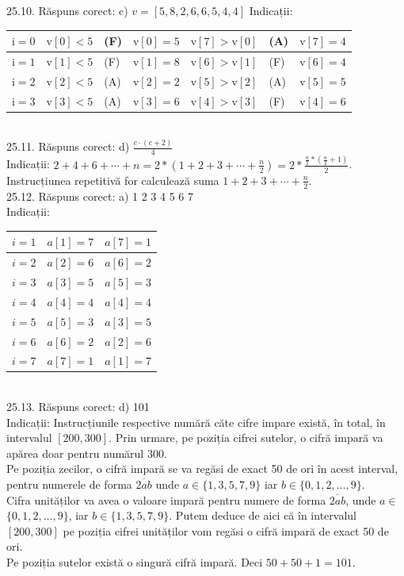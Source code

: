 25.10. Răspuns corect: c) $v=[5,8,2,6,6,5,4,4]$
Indicații:\\ \begin{tabular}{|l|ll|l|ll|l|} \hline $\mathrm{i}=0$ & $\mathrm{v}[0]<5$ & (F) & $\mathrm{v}[0]=5$ & $\mathrm{v}[7]>\mathrm{v}[0]$ & (A) & $\mathrm{v}[7]=4$ \\ \hline $\mathrm{i}=1$ & $\mathrm{v}[1]<5$ & (F) & $\mathrm{v}[1]=8$ & $\mathrm{v}[6]>\mathrm{v}[1]$ & (F) & $\mathrm{v}[6]=4$ \\ \hline $\mathrm{i}=2$ & $\mathrm{v}[2]<5$ & (A) & $\mathrm{v}[2]=2$ & $\mathrm{v}[5]>\mathrm{v}[2]$ & (A) & $\mathrm{v}[5]=5$ \\ \hline $\mathrm{i}=3$ & $\mathrm{v}[3]<5$ & (A) & $\mathrm{v}[3]=6$ & $\mathrm{v}[4]>\mathrm{v}[3]$ & (F) & $\mathrm{v}[4]=6$ \\ \hline \end{tabular}\\

25.11. Răspuns corect: d) $\frac{c \cdot(c+2)}{4}$\\
Indicații: $2+4+6+\cdots+n=2 *\left(1+2+3+\cdots+\frac{n}{2}\right)=2 * \frac{\frac{n}{2} *\left(\frac{n}{2}+1\right)}{2}$.\\ Instrucțiunea repetitivă for calculează suma $1+2+3+\cdots+\frac{n}{2}$.\\

25.12. Răspuns corect: a) 1 2 3 4 5 6 7\\
Indicații:\\ \begin{tabular}{|l|l|l|} \hline$i=1$ & $a[1]=7$ & $a[7]=1$ \\ \hline$i=2$ & $a[2]=6$ & $a[6]=2$ \\ \hline$i=3$ & $a[3]=5$ & $a[5]=3$ \\ \hline$i=4$ & $a[4]=4$ & $a[4]=4$ \\ \hline$i=5$ & $a[5]=3$ & $a[3]=5$ \\ \hline$i=6$ & $a[6]=2$ & $a[2]=6$ \\ \hline$i=7$ & $a[7]=1$ & $a[1]=7$ \\ \hline \end{tabular}\\

25.13. Răspuns corect: d) 101\\
Indicații: Instrucțiunile respective numără căte cifre impare există, în total, în intervalul $[200,300]$. Prin urmare, pe poziția cifrei sutelor, o cifră impară va apărea doar pentru numărul 300.\\ Pe poziția zecilor, o cifră impară se va regăsi de exact 50 de ori în acest interval, pentru numerele de forma $\overline{2 a b}$ unde $a \in\{1, 3, 5, 7, 9\}$ iar $b \in\{0,1,2, \ldots, 9\}$.\\ Cifra unităților va avea o valoare impară pentru numere de forma $\overline{2 a b}$, unde $a \in$ $\{0,1,2, \ldots, 9\}$, iar $b \in\{1,3,5,7,9\}$. Putem deduce de aici că în intervalul $[200,300]$ pe poziția cifrei unităților vom regăsi o cifră impară de exact 50 de ori.\\ Pe poziția sutelor există o singură cifră impară. Deci $50+50+1=101$.\\


